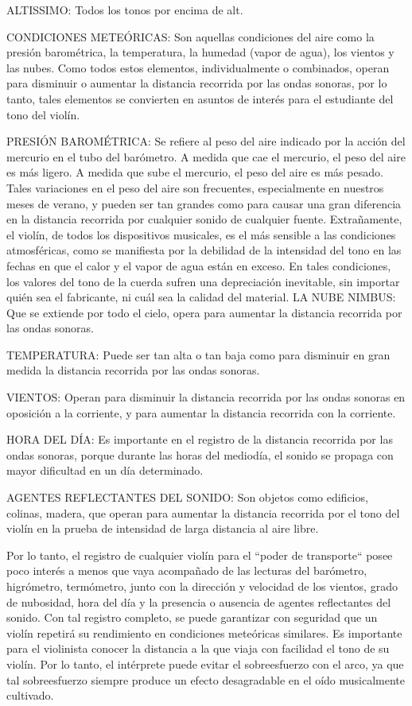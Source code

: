 \documentclass[12pt]{book}
\begin{document}
ALTISSIMO: Todos los tonos por encima de alt.

CONDICIONES METEÓRICAS: Son aquellas condiciones del aire como la presión barométrica, la temperatura, la humedad (vapor de agua), los vientos y las nubes. Como todos estos elementos, individualmente o combinados, operan para disminuir o aumentar la distancia recorrida por las ondas sonoras, por lo tanto, tales elementos se convierten en asuntos de interés para el estudiante del tono del violín.

PRESIÓN BAROMÉTRICA: Se refiere al peso del aire indicado por la acción del mercurio en el tubo del barómetro. A medida que cae el mercurio, el peso del aire es más ligero. A medida que sube el mercurio, el peso del aire es más pesado. Tales variaciones en el peso del aire son frecuentes, especialmente en nuestros meses de verano, y pueden ser tan grandes como para causar una gran diferencia en la distancia recorrida por cualquier sonido de cualquier fuente. Extrañamente, el violín, de todos los dispositivos musicales, es el más sensible a las condiciones atmosféricas, como se manifiesta por la debilidad de la intensidad del tono en las fechas en que el calor y el vapor de agua están en exceso. En tales condiciones, los valores del tono de la cuerda sufren una depreciación inevitable, sin importar quién sea el fabricante, ni cuál sea la calidad del material.
LA NUBE NIMBUS: Que se extiende por todo el cielo, opera para aumentar la distancia recorrida por las ondas sonoras.

TEMPERATURA: Puede ser tan alta o tan baja como para disminuir en gran medida la distancia recorrida por las ondas sonoras.

VIENTOS: Operan para disminuir la distancia recorrida por las ondas sonoras en oposición a la corriente, y para aumentar la distancia recorrida con la corriente.

HORA DEL DÍA: Es importante en el registro de la distancia recorrida por las ondas sonoras, porque durante las horas del mediodía, el sonido se propaga con mayor dificultad en un día determinado.

AGENTES REFLECTANTES DEL SONIDO: Son objetos como edificios, colinas, madera, que operan para aumentar la distancia recorrida por el tono del violín en la prueba de intensidad de larga distancia al aire libre.

Por lo tanto, el registro de cualquier violín para el ``poder de transporte`` posee poco interés a menos que vaya acompañado de las lecturas del barómetro, higrómetro, termómetro, junto con la dirección y velocidad de los vientos, grado de nubosidad, hora del día y la presencia o ausencia de agentes reflectantes del sonido. Con tal registro completo, se puede garantizar con seguridad que un violín repetirá su rendimiento en condiciones meteóricas similares. Es importante para el violinista conocer la distancia a la que viaja con facilidad el tono de su violín. Por lo tanto, el intérprete puede evitar el sobreesfuerzo con el arco, ya que tal sobreesfuerzo siempre produce un efecto desagradable en el oído musicalmente cultivado.
\end{document}
